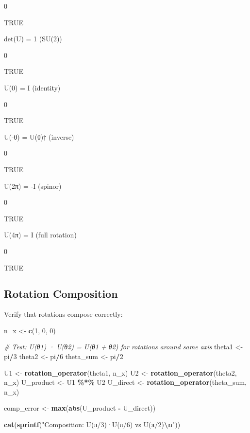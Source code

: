 \documentclass[
]{book}
\newenvironment{Shaded}{\begin{snugshade}}{\end{snugshade}}
\newcommand{\CommentTok}[1]{\textcolor[rgb]{0.56,0.35,0.01}{\textit{#1}}}
\newcommand{\DecValTok}[1]{\textcolor[rgb]{0.00,0.00,0.81}{#1}}
\newcommand{\FunctionTok}[1]{\textcolor[rgb]{0.13,0.29,0.53}{\textbf{#1}}}
\newcommand{\NormalTok}[1]{#1}
\newcommand{\OtherTok}[1]{\textcolor[rgb]{0.56,0.35,0.01}{#1}}
\newcommand{\SpecialCharTok}[1]{\textcolor[rgb]{0.81,0.36,0.00}{\textbf{#1}}}
\newcommand{\StringTok}[1]{\textcolor[rgb]{0.31,0.60,0.02}{#1}}
\theoremstyle{definition}
\theoremstyle{definition}
\theoremstyle{definition}
\theoremstyle{definition}
\theoremstyle{remark}
\begin{document}
0

TRUE

det(U) = 1 (SU(2))

0

TRUE

U(0) = I (identity)

0

TRUE

U(-θ) = U(θ)† (inverse)

0

TRUE

U(2π) = -I (spinor)

0

TRUE

U(4π) = I (full rotation)

0

TRUE

\subsection{Rotation Composition}\label{rotation-composition}

Verify that rotations compose correctly:

\begin{Shaded}
\begin{Highlighting}[]
\NormalTok{n\_x }\OtherTok{\textless{}{-}} \FunctionTok{c}\NormalTok{(}\DecValTok{1}\NormalTok{, }\DecValTok{0}\NormalTok{, }\DecValTok{0}\NormalTok{)}

\CommentTok{\# Test: U(θ1) · U(θ2) = U(θ1 + θ2) for rotations around same axis}
\NormalTok{theta1 }\OtherTok{\textless{}{-}}\NormalTok{ pi}\SpecialCharTok{/}\DecValTok{3}
\NormalTok{theta2 }\OtherTok{\textless{}{-}}\NormalTok{ pi}\SpecialCharTok{/}\DecValTok{6}
\NormalTok{theta\_sum }\OtherTok{\textless{}{-}}\NormalTok{ pi}\SpecialCharTok{/}\DecValTok{2}

\NormalTok{U1 }\OtherTok{\textless{}{-}} \FunctionTok{rotation\_operator}\NormalTok{(theta1, n\_x)}
\NormalTok{U2 }\OtherTok{\textless{}{-}} \FunctionTok{rotation\_operator}\NormalTok{(theta2, n\_x)}
\NormalTok{U\_product }\OtherTok{\textless{}{-}}\NormalTok{ U1 }\SpecialCharTok{\%*\%}\NormalTok{ U2}
\NormalTok{U\_direct }\OtherTok{\textless{}{-}} \FunctionTok{rotation\_operator}\NormalTok{(theta\_sum, n\_x)}

\NormalTok{comp\_error }\OtherTok{\textless{}{-}} \FunctionTok{max}\NormalTok{(}\FunctionTok{abs}\NormalTok{(U\_product }\SpecialCharTok{{-}}\NormalTok{ U\_direct))}

\FunctionTok{cat}\NormalTok{(}\FunctionTok{sprintf}\NormalTok{(}\StringTok{"Composition: U(π/3)·U(π/6) vs U(π/2)}\SpecialCharTok{\textbackslash{}n}\StringTok{"}\NormalTok{))}
\end{Highlighting}
\end{Shaded}
\end{document}

